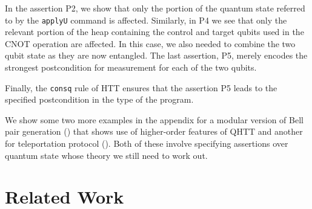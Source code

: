 \documentclass[acmsmall,nonacm,timestamp,review=false,anonymous=false]{acmart}
\begin{document}
In the assertion P2, we show that only the portion of the quantum state referred to by the \texttt{applyU} command is affected. Similarly, in P4 we see that only the relevant portion of the heap containing the control and target qubits used in the CNOT operation are affected. In this case, we also needed to combine the two qubit state as they are now entangled. The last assertion, P5, merely encodes the strongest postcondition for measurement for each of the two qubits.

Finally, the \texttt{consq} rule of HTT ensures that the assertion P5 leads to the specified postcondition in the type of the program.

We show some two more examples in the appendix for a modular version of Bell pair generation () that shows use of higher-order features of QHTT and another for teleportation protocol (). Both of these involve specifying assertions over quantum state whose theory we still need to work out.





\section{Related Work}
\label{sec:related}

\end{document}
